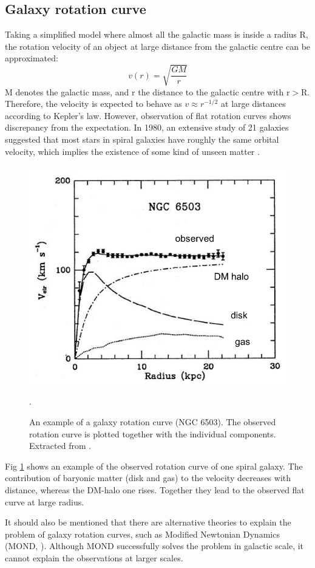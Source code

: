 \subsection*{Galaxy rotation curve}
Taking a simplified model where almost all the galactic mass is inside a radius R, the rotation velocity of an object at large distance from the galactic centre can be approximated:
\begin{equation}
  v(r)=\sqrt{\frac{GM}{r}}
\end{equation}
M denotes the galactic mass, and r the distance to the galactic centre with $\mathrm{r}>\mathrm{R}$. Therefore, the velocity is expected to behave as $v \approx r^{-1/2}$ at large distances according to Kepler's law. However, observation of flat rotation curves shows discrepancy from the expectation. In 1980, an extensive study of 21 galaxies suggested that most stars in spiral galaxies have roughly the same orbital velocity, which implies the existence of some kind of unseen matter \cite{Rub80}.
\begin{figure}[ht]
  \centering
  \includegraphics[width=0.75\textwidth{}]{./fig/rotation_curve.png}
  \caption{ An example of a galaxy rotation curve (NGC 6503). The observed rotation curve is plotted together with the individual components. Extracted from \cite{Rub80}.}.
  \label{fig:rotation-curve}
\end{figure}
Fig \ref{fig:rotation-curve} shows an example of the observed rotation curve of one spiral galaxy. The contribution of baryonic matter (disk and gas) to the velocity decreases with distance, whereas the DM-halo one rises. Together they lead to the observed flat curve at large radius.

It should also be mentioned that there are alternative theories to explain the problem of galaxy rotation curves, such as Modified Newtonian Dynamics (MOND, \cite{Mil83}). Although MOND successfully solves the problem in galactic scale, it cannot explain the observations at larger scales.

